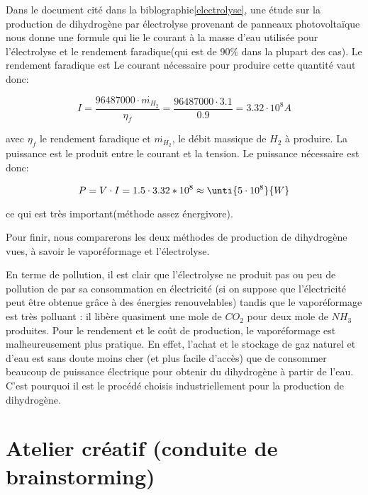 Dans le document cité dans la biblographie\ref{electrolyse}, une étude sur la production
de dihydrogène par électrolyse provenant de panneaux photovoltaïque nous
donne une formule qui lie le courant à la masse d'eau utilisée pour
l'électrolyse et le rendement faradique(qui est de $90\%$ dans la plupart des cas).
Le rendement faradique est Le courant nécessaire pour produire cette quantité vaut donc:

$$I = \frac{96487000\cdot {\dot{m_{H_{2}}}}}{\eta_{f}} = \frac{96487000\cdot 3.1}{0.9} =  \unit{3.32\cdot 10^{8}}{A}$$

avec $\eta_{f}$ le rendement faradique et $\dot{m_{H_{2}}}$, le débit massique
de $H_{2}$ à produire. La puissance est le produit entre le courant et la 
tension. Le puissance nécessaire est donc:

$$P = V\cdot I = 1.5\cdot 3.32*10^{8} \approx \unti{5\cdot 10^{8}}{W}$$

ce qui est très important(méthode assez énergivore).

Pour finir, nous comparerons les deux méthodes de production de 
dihydrogène vues, à savoir le vaporéformage et l'électrolyse.

En terme de pollution, il est clair que l'électrolyse ne produit 
pas ou peu de pollution de par sa consommation en électricité 
(si on suppose que l'électricité peut être obtenue grâce à des énergies renouvelables)
tandis que le vaporéformage est très polluant : il libère quasiment une mole de $CO_{2}$
pour deux mole de $NH_{3}$ produites. Pour le rendement et le coût de production, 
le vaporéformage est malheureusement plus pratique. En effet, l'achat et le stockage
de gaz naturel et d'eau est sans doute moins cher (et plus facile d'accès) que 
de consommer beaucoup de puissance électrique pour obtenir du dihydrogène à partir
de l'eau. C'est pourquoi il est le procédé choisis industriellement pour la production
de dihydrogène.

\section{Atelier créatif (conduite de brainstorming)}



